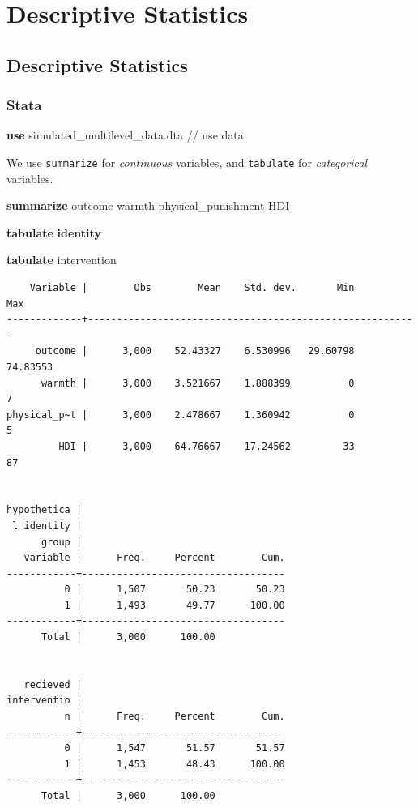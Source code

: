 \documentclass[
  letterpaper,
  DIV=11,
  numbers=noendperiod]{scrreprt}
\newenvironment{Shaded}{\begin{snugshade}}{\end{snugshade}}
\newcommand{\CommentTok}[1]{\textcolor[rgb]{0.37,0.37,0.37}{#1}}
\newcommand{\KeywordTok}[1]{\textcolor[rgb]{0.00,0.23,0.31}{\textbf{#1}}}
\newcommand{\NormalTok}[1]{\textcolor[rgb]{0.00,0.23,0.31}{#1}}
\begin{document}

\chapter{Descriptive Statistics}\label{descriptive-statistics-2}

\section{Descriptive Statistics}\label{descriptive-statistics-3}

\subsection{Stata}

\begin{Shaded}
\begin{Highlighting}[]

\KeywordTok{use}\NormalTok{ simulated\_multilevel\_data.dta }\CommentTok{// use data}
\end{Highlighting}
\end{Shaded}

We use \texttt{summarize} for \emph{continuous} variables, and
\texttt{tabulate} for \emph{categorical} variables.

\begin{Shaded}
\begin{Highlighting}[]
\KeywordTok{summarize}\NormalTok{ outcome warmth physical\_punishment HDI}

\KeywordTok{tabulate} \KeywordTok{identity}

\KeywordTok{tabulate}\NormalTok{ intervention}
\end{Highlighting}
\end{Shaded}

\begin{verbatim}
    Variable |        Obs        Mean    Std. dev.       Min        Max
-------------+---------------------------------------------------------
     outcome |      3,000    52.43327    6.530996   29.60798   74.83553
      warmth |      3,000    3.521667    1.888399          0          7
physical_p~t |      3,000    2.478667    1.360942          0          5
         HDI |      3,000    64.76667    17.24562         33         87


hypothetica |
 l identity |
      group |
   variable |      Freq.     Percent        Cum.
------------+-----------------------------------
          0 |      1,507       50.23       50.23
          1 |      1,493       49.77      100.00
------------+-----------------------------------
      Total |      3,000      100.00


   recieved |
interventio |
          n |      Freq.     Percent        Cum.
------------+-----------------------------------
          0 |      1,547       51.57       51.57
          1 |      1,453       48.43      100.00
------------+-----------------------------------
      Total |      3,000      100.00
\end{verbatim}
\end{document}
